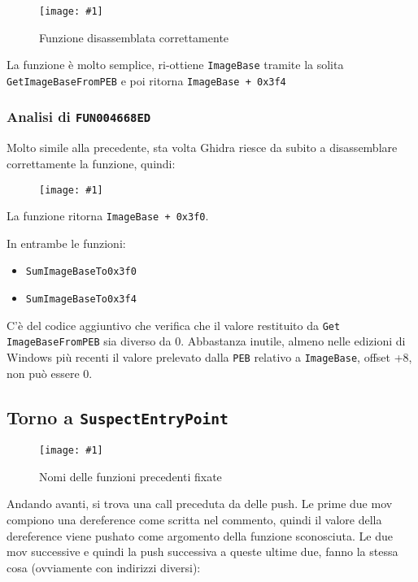 \documentclass[
    a4paper, %
    11pt %
]{article}
\newcommand{\pic}[4]{\begin{figure}[H]
            \centering
            \texttt{[image: \#1]}
            \caption{#2}
            \label{fig:#1}
            \end{figure}}
\begin{document}
            \pic{see_unkfn0_ok}{Funzione disassemblata correttamente}{12cm}{16cm}

            La funzione è molto semplice, ri-ottiene \texttt{ImageBase} tramite la solita \texttt{Get\textunderscore ImageBase\textunderscore FromPEB}
            e poi ritorna \texttt{ImageBase + 0x3f4}

            \pagebreak
            
            \subsubsection{Analisi di \texttt{FUN\textunderscore 004668ED}}

            Molto simile alla precedente, sta volta Ghidra riesce da subito a disassemblare correttamente la funzione,
            quindi:
            
            \pic{see_unkfn1_ok}{}{12cm}{16cm}

            La funzione ritorna \texttt{ImageBase + 0x3f0}. 
            
            In entrambe le funzioni:
            \begin{itemize}
                \item \texttt{Sum\textunderscore ImageBase\textunderscore To\textunderscore 0x3f0}
                \item \texttt{Sum\textunderscore ImageBase\textunderscore To\textunderscore 0x3f4}
            \end{itemize}

            C'è del codice aggiuntivo che verifica che il valore restituito da \texttt{Get\textunderscore 
            ImageBase\textunderscore FromPEB} 
            sia diverso
            da 0. 
            Abbastanza inutile, almeno nelle edizioni di Windows più recenti il valore prelevato dalla \texttt{PEB}
            relativo a \texttt{ImageBase}, offset +8, non può essere 0.

            \subsection{Torno a \texttt{SuspectEntryPoint}}

            \pic{see_nextunkfn_ok}{Nomi delle funzioni precedenti fixate}{10cm}{3cm}

            Andando avanti, si trova una call preceduta da delle push. 
            Le prime due mov compiono una dereference come scritta nel commento, quindi il valore della dereference
            viene pushato come argomento della funzione sconosciuta.
            Le due mov successive e quindi la push successiva a queste ultime due, fanno la stessa cosa (ovviamente con indirizzi diversi):
\end{document}
